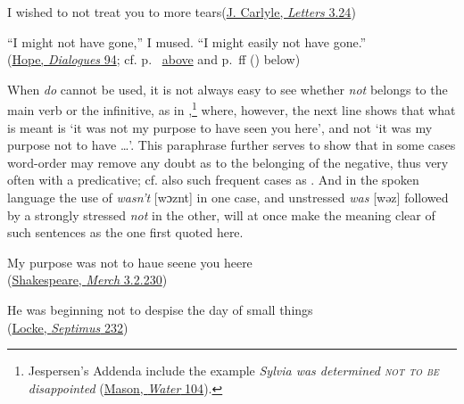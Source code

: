 \ea \label{ex:05-73b}
I wished to not treat you to more tears\hfill(\href{https://digital.library.upenn.edu/women/carlyle/jwclam/lam301.html#24}{J. Carlyle, \textit{Letters} 3.24})
\z

\ea \label{ex:05-73c}
``I might not have gone,'' I mused. ``I might easily not have gone.''\\\hfill(\href{https://archive.org/details/dollydialogues00hope_0/page/152/mode/2up?view=theater&q=%22might+not+have+gone%22}{Hope, \textit{Dialogues} 94}; cf. p.~\pageref{p:48} \hyperref[p:48]{above} %
and p.~\pageref{must-and-may}ff () below) %
\z

When \textit{do} cannot be used, it is not always easy to see whether \textit{not} belongs to the main verb or the infinitive, as in ,\footnote{Jespersen's Addenda include the example \textit{Sylvia was determined \textsc{not to be} disappointed} (\href{https://archive.org/details/runningwater00masouoft/page/114/mode/2up?view=theater}{Mason, \textit{Water} 104}). \eds} %
where, however, the next line shows that what is meant is `it was not my purpose to have seen you here', and not `it was my purpose not to have {\dots}'. This paraphrase further serves to show that in some cases word-order may remove any doubt as to the belonging of the negative, thus very often with a predicative; cf. also such frequent cases as . And in the spoken language the use of \textit{wasn't} [wɔznt] in one case, and unstressed \textit{was} [wəz] followed by a strongly stressed \textit{not} in the other, will at once make the meaning clear of such sentences as the one first quoted here.

\ea \label{ex:05-86}
My purpose was not to haue seene you heere\\\hfill(\href{https://internetshakespeare.uvic.ca/doc/MV_F1/scene/3.2/index.html#tln-1575}{Shakespeare, \textit{Merch} 3.2.230}) %
\z

\ea \label{ex:05-87}
He was beginning not to despise the day of small things\\\hfill(\href{https://archive.org/details/septimus00unkngoog/page/n221/mode/2up?q=%22was+beginning+not%22&view=theater}{Locke, \textit{Septimus} 232})
\z

